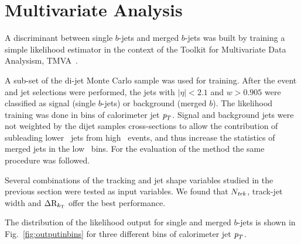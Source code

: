 %
%
\chapter{Multivariate Analysis}\label{sec:gbbTMVA}

A discriminant between single $b$-jets and merged $b$-jets was built by training a simple likelihood estimator in the context of the Toolkit for Multivariate Data Analysism, TMVA~\cite{Hocker:2007ht}.

A sub-set of the di-jet Monte Carlo sample was used for training. After the event and jet selections were performed, the jets with $|\eta| < 2.1$ and $w > 0.905$ were classified as signal (single $b$-jets) or background (merged $b$). %
The likelihood training was done in bins of calorimeter jet ${\emph{p}_{T}}$. %
Signal and background jets were not weighted by the dijet samples cross-sections to allow the contribution of subleading lower \pt\ jets from high \pt\ events, and thus increase the statistics of merged jets in the low \pt\ bins. For the evaluation of the method the same procedure was followed.

Several combinations of the tracking and jet shape variables studied in the previous section were tested as input variables. We found that $N_{\it trk}$, track-jet width and $\Delta {\rm R}_{k_{\rm T}}$ offer the best performance.

The distribution of the likelihood output for single and merged $b$-jets is shown in  Fig.~\ref{fig:outputinbins} for three different bins of calorimeter jet ${\emph{p}_{T}}$.

